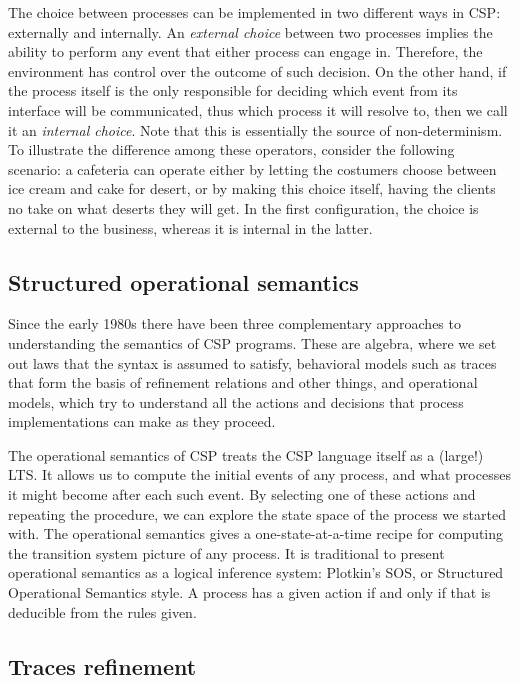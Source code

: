 The choice between processes can be implemented in two different ways in CSP: externally and internally. An \emph{external choice} between two processes implies the ability to perform any event that either process can engage in. Therefore, the environment has control over the outcome of such decision. On the other hand, if the process itself is the only responsible for deciding which event from its interface will be communicated, thus which process it will resolve to, then we call it an \emph{internal choice}. Note that this is essentially the source of non-determinism. To illustrate the difference among these operators, consider the following scenario: a cafeteria can operate either by letting the costumers choose between ice cream and cake for desert, or by making this choice itself, having the clients no take on what deserts they will get. In the first configuration, the choice is external to the business, whereas it is internal in the latter.

\subsection{Structured operational semantics}

Since the early 1980s there have been three complementary approaches to understanding the semantics of CSP programs. These are algebra, where we set out laws that the syntax is assumed to satisfy, behavioral models such as traces that form the basis of refinement relations and other things, and operational models, which try to understand all the actions and decisions that process implementations can make as they proceed.

The operational semantics of CSP treats the CSP language itself as a (large!) LTS. It allows us to compute the initial events of any  process, and what processes it might become after each such event. By selecting one of these actions and repeating the procedure, we can explore the state space of the process we started with. The operational semantics gives a one-state-at-a-time recipe for computing the transition system picture of any process. It is traditional to present operational semantics as a logical inference system: Plotkin’s SOS, or Structured Operational Semantics style. A process has a given action if and only if that is deducible from the rules given.

\subsection{Traces refinement}


